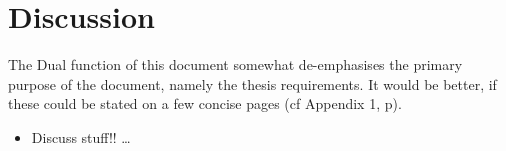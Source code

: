 \section{Discussion}

The Dual function of this document somewhat de-emphasises the primary
purpose of the document, namely the thesis requirements.  It would be
better, if these could be stated on a few concise pages (cf Appendix
1, p\pageref{app1}).

\begin{itemize}
  \item Discuss stuff!!
\ldots
\end{itemize}
